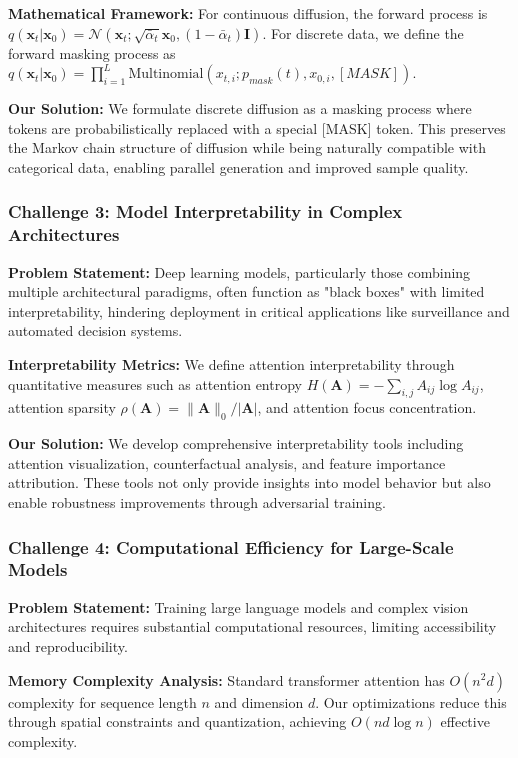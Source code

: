 \documentclass[a4paper,12pt]{article}
\begin{document}
\textbf{Mathematical Framework:} For continuous diffusion, the forward process is $q(\mathbf{x}_t | \mathbf{x}_0) = \mathcal{N}(\mathbf{x}_t; \sqrt{\bar{\alpha}_t}\mathbf{x}_0, (1-\bar{\alpha}_t)\mathbf{I})$. For discrete data, we define the forward masking process as $q(\mathbf{x}_t | \mathbf{x}_0) = \prod_{i=1}^L \text{Multinomial}(x_{t,i}; p_{mask}(t), x_{0,i}, [MASK])$.

\textbf{Our Solution:} We formulate discrete diffusion as a masking process where tokens are probabilistically replaced with a special [MASK] token. This preserves the Markov chain structure of diffusion while being naturally compatible with categorical data, enabling parallel generation and improved sample quality.

\subsubsection{Challenge 3: Model Interpretability in Complex Architectures}

\textbf{Problem Statement:} Deep learning models, particularly those combining multiple architectural paradigms, often function as "black boxes" with limited interpretability, hindering deployment in critical applications like surveillance and automated decision systems.

\textbf{Interpretability Metrics:} We define attention interpretability through quantitative measures such as attention entropy $H(\mathbf{A}) = -\sum_{i,j} A_{ij} \log A_{ij}$, attention sparsity $\rho(\mathbf{A}) = \|\mathbf{A}\|_0 / |\mathbf{A}|$, and attention focus concentration.

\textbf{Our Solution:} We develop comprehensive interpretability tools including attention visualization, counterfactual analysis, and feature importance attribution. These tools not only provide insights into model behavior but also enable robustness improvements through adversarial training.

\subsubsection{Challenge 4: Computational Efficiency for Large-Scale Models}

\textbf{Problem Statement:} Training large language models and complex vision architectures requires substantial computational resources, limiting accessibility and reproducibility.

\textbf{Memory Complexity Analysis:} Standard transformer attention has $O(n^2d)$ complexity for sequence length $n$ and dimension $d$. Our optimizations reduce this through spatial constraints and quantization, achieving $O(n d \log n)$ effective complexity.
\end{document}
